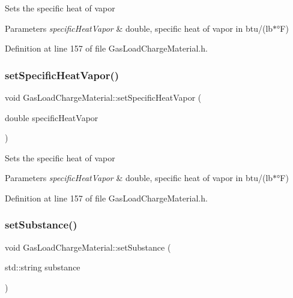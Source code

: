 Sets the specific heat of vapor 
\begin{DoxyParams}{Parameters}
{\em specific\+Heat\+Vapor} & double, specific heat of vapor in btu/(lb$\ast$°F) \\
\hline
\end{DoxyParams}


Definition at line 157 of file Gas\+Load\+Charge\+Material.\+h.

\mbox{\label{class_gas_load_charge_material_a7498eba84bb8bdfc5344f0e44418260b}} 
\subsubsection{\texorpdfstring{set\+Specific\+Heat\+Vapor()}{setSpecificHeatVapor()}\hspace{0.1cm}{\footnotesize\ttfamily [3/3]}}
{\footnotesize\ttfamily void Gas\+Load\+Charge\+Material\+::set\+Specific\+Heat\+Vapor (\begin{DoxyParamCaption}\item[{double}]{specific\+Heat\+Vapor }\end{DoxyParamCaption})\hspace{0.3cm}{\ttfamily [inline]}}

Sets the specific heat of vapor 
\begin{DoxyParams}{Parameters}
{\em specific\+Heat\+Vapor} & double, specific heat of vapor in btu/(lb$\ast$°F) \\
\hline
\end{DoxyParams}


Definition at line 157 of file Gas\+Load\+Charge\+Material.\+h.

\mbox{\label{class_gas_load_charge_material_a20cc3df601d8daae9b8f8e7b0c53c2e3}} 
\subsubsection{\texorpdfstring{set\+Substance()}{setSubstance()}\hspace{0.1cm}{\footnotesize\ttfamily [1/3]}}
{\footnotesize\ttfamily void Gas\+Load\+Charge\+Material\+::set\+Substance (\begin{DoxyParamCaption}\item[{std\+::string}]{substance }\end{DoxyParamCaption})\hspace{0.3cm}{\ttfamily [inline]}}

